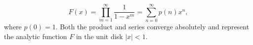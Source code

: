 $$F(x) = \prod_{m=1}^{\infty} \frac{1}{1-x^m} = \sum_{n=0}^{\infty} p(n)x^n,$$
where $p(0) = 1$. Both the product and series converge absolutely and represent the analytic function $F$ in the unit disk $|x| < 1$.
